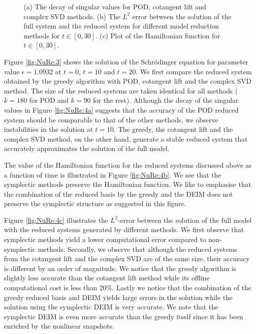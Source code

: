 \begin{figure}
\caption{(a) The decay of singular values for POD, cotangent lift and complex SVD methods. (b) The $L^2$ error between the solution of the full system and the reduced system for different model reduction methods for $t \in [0,30]$. (c) Plot of the Hamiltonian function for $t \in [0,30]$.}
\label{fig:NuRe:4}
\end{figure}


Figure \ref{fig:NuRe:3} shows the solution of the Schr\"odinger equation for parameter value $\epsilon = 1.0932$ at $t=0$, $t=10$ and $t=20$. We first compare the reduced system obtained by the greedy algorithm with POD, cotangent lift and the complex SVD method. The size of the reduced systems are taken identical for all methods ($k=180$ for POD and $k=90$ for the rest). Although the decay of the singular values in Figure \ref{fig:NuRe:4a} suggests that the accuracy of the POD reduced system should be comparable to that of the other methods, we observe instabilities in the solution at $t=10$. The greedy, the cotangent lift and the complex SVD method, on the other hand, generate a stable reduced system that accurately approximates the solution of the full model.

The value of the Hamiltonian function for the reduced systems discussed above as a function of time is illustrated in Figure \ref{fig:NuRe:4b}. We see that the symplectic methods preserve the Hamiltonian function. We like to emphasise that the combination of the reduced basis by the greedy and the DEIM does not preserve the symplectic structure as suggested in this figure.

Figure \ref{fig:NuRe:4c} illustrates the $L^2$-error between the solution of the full model with the reduced systems generated by different methods. We first observe that symplectic methods yield a lower computational error compared to non-symplectic methods. Secondly, we observe that although the reduced systems from the cotangent lift and the complex SVD are of the same size, their accuracy is different by an order of magnitude. We notice that the greedy algorithm is slightly less accurate than the cotangent lift method while its offline computational cost is less than 20\%. Lastly we notice that the combination of the greedy reduced basis and DEIM yields large errors in the solution while the solution using the symplectic DEIM is very accurate. We note that the symplectic DEIM is even more accurate than the greedy itself since it has been enriched by the nonlinear snapshots. 




